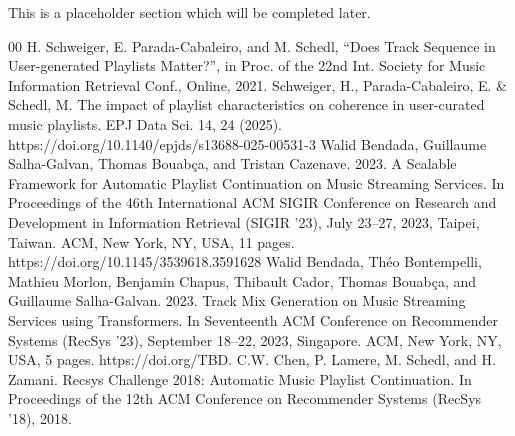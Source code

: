 \documentclass[conference]{IEEEtran}
\begin{document}
This is a placeholder section which will be completed later.

\begin{thebibliography}{00}
 H. Schweiger, E. Parada-Cabaleiro, and M.
Schedl, “Does Track Sequence in User-generated Playlists Matter?”, in
Proc. of the 22nd Int. Society for Music Information Retrieval Conf.,
Online, 2021.
 Schweiger, H., Parada-Cabaleiro, E. \& Schedl, M. The impact of playlist characteristics on coherence in user-curated music playlists. EPJ Data Sci. 14, 24 (2025). https://doi.org/10.1140/epjds/s13688-025-00531-3
 Walid Bendada, Guillaume Salha-Galvan, Thomas Bouabça, and Tristan
Cazenave. 2023. A Scalable Framework for Automatic Playlist Continuation
on Music Streaming Services. In Proceedings of the 46th International ACM
SIGIR Conference on Research and Development in Information Retrieval
(SIGIR ’23), July 23–27, 2023, Taipei, Taiwan. ACM, New York, NY, USA,
11 pages. https://doi.org/10.1145/3539618.3591628
 Walid Bendada, Théo Bontempelli, Mathieu Morlon, Benjamin Chapus, Thibault Cador, Thomas Bouabça, and Guillaume Salha-Galvan.
2023. Track Mix Generation on Music Streaming Services using Transformers. In Seventeenth ACM Conference on Recommender Systems
(RecSys ’23), September 18–22, 2023, Singapore. ACM, New York, NY, USA, 5 pages. https://doi.org/TBD.
 C.W. Chen, P. Lamere, M. Schedl, and H. Zamani. Recsys Challenge 2018: Automatic Music Playlist Continuation. In Proceedings of the 12th ACM Conference on Recommender Systems (RecSys ’18), 2018.

\end{thebibliography}
\end{document}
